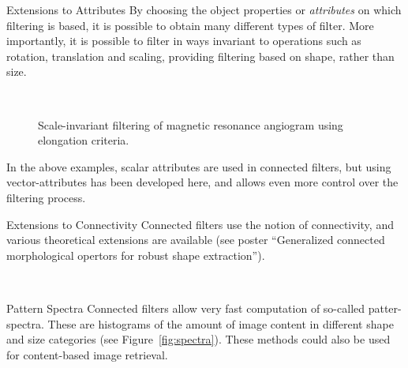 \documentclass[b1,largefonts,plainsections]{sciposter}
\begin{document}
\begin{multicols}{2}
\begin{sectionbox}{Extensions to Attributes}
By choosing the object properties or \emph{attributes} on which
filtering is based, it is possible to obtain many different types of
filter. More importantly, it is possible to filter in ways invariant
to operations such as rotation, translation and scaling, providing
filtering based on shape, rather than size.
\begin{figure}
\begin{center}
\\[1.5ex]
\end{center}
\caption{Scale-invariant filtering of magnetic resonance angiogram
  using elongation criteria.}
\end{figure}

In the above examples, scalar attributes are used in connected
filters, but using vector-attributes has been developed here, and
allows even more control over the filtering process.
\end{sectionbox}

\vfill
\begin{sectionbox}{Extensions to Connectivity}
Connected filters use the notion of connectivity, and various
theoretical extensions are available (see poster ``Generalized 
connected morphological opertors for robust shape extraction'').
\end{sectionbox}\\
\begin{sectionbox}{Pattern Spectra}
Connected filters allow very fast computation of so-called
patter-spectra. These are histograms of the amount of image content in
different shape and size categories (see Figure~\ref{fig:spectra}).
These methods could also be used for content-based image retrieval.


\end{sectionbox}
\end{multicols}
\end{document}
